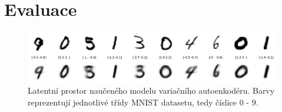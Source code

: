 \section{Evaluace}
\begin{figure}[H]
    \centering
    \includegraphics[width=\textwidth]{figures/eval.png}
    \caption{Latentní prostor naučeného modelu variačního autoenkodéru. Barvy reprezentují jednotlivé třídy MNIST datasetu, tedy číslice $0$ - $9$. }
\end{figure}